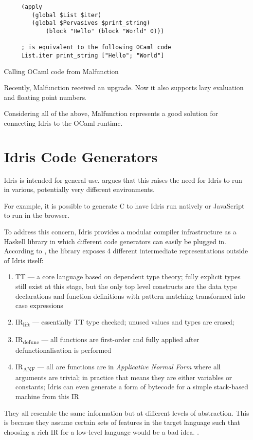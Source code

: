 \begin{listing}
    \begin{verbatim}
     (apply
        (global $List $iter)
        (global $Pervasives $print_string)
            (block "Hello" (block "World" 0)))

     ; is equivalent to the following OCaml code
     List.iter print_string ["Hello"; "World"]
  \end{verbatim}
    \caption{Calling OCaml code from Malfunction}
    \label{lst:mlfforeign}
\end{listing}

% 

Recently, Malfunction received an upgrade.
Now it also supports lazy evaluation and
floating point numbers.

Considering all of the above, Malfunction represents a good
solution for connecting Idris to the OCaml runtime.

\section{Idris Code Generators}

Idris is intended for general use. \citep{crosscompilers} argues
that this raises the need for Idris to run in various, potentially
very different environments.

For example, it is possible to generate C to have Idris run
natively or JavaScript to run in the browser.

To address this concern, Idris provides a modular compiler
infrastructure as a Haskell library in which different code
generators can easily be plugged in.
According to \citep{crosscompilers},
the library exposes 4 different intermediate representations outside
of Idris itself:
\begin{enumerate}
    \item TT --- a core language based on dependent type theory; fully
          explicit types still exist at this stage, but the only top level
          constructs are the data type declarations and function definitions
          with pattern matching transformed into case expressions
    \item IR\textsubscript{lift} --- essentially TT type checked; unused values
          and types are erased;
    \item IR\textsubscript{defunc} --- all functions are first-order
          and fully applied after defunctionalisation is performed
    \item IR\textsubscript{ANF} --- all are functions are in
          \emph{Applicative Normal Form} where all arguments are trivial;
          in practice that means they are either variables or constants;
          Idris can even generate a form of bytecode for a simple
          stack-based machine from this IR
\end{enumerate}
They all resemble the same information but at different levels
of abstraction. This is because they assume certain sets of features
in the target language such that choosing a rich IR
for a low-level language would be a bad idea.
\citep{ElliottIdrisErlang}.


